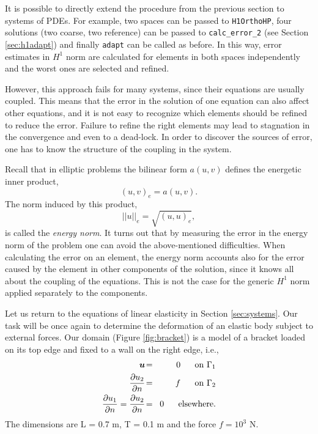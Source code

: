 It is possible to directly extend the procedure from the previous section to systems
of PDEs. For example, two spaces can be passed to {\tt H1OrthoHP}, four solutions (two coarse,
two reference) can be passed to \verb"calc_error_2" (see Section \ref{sec:h1adapt}) and finally
{\tt adapt} can be called as before. In this way, error estimates in $H^1$ norm are calculated
for elements in both spaces independently and the worst ones are selected and refined.

However, this approach fails for many systems, since their equations are usually coupled.
This means that the error in the solution of one equation can also affect other equations,
and it is not easy to recognize which elements should be refined to reduce the error.
Failure to refine the right elements may lead to stagnation in the convergence and even to a dead-lock.
In order to discover the sources of error, one has to know the structure of the coupling in the
system.

Recall that in elliptic problems the bilinear form $a(u,v)$ defines the energetic inner product,
$$(u,v)_e = a(u,v).$$
The norm induced by this product,
$$||u||_e = \sqrt{(u,u)_e},$$
is called the {\it energy norm}.  
It turns out that by measuring the error in the energy norm of the problem one can avoid the
above-mentioned difficulties. When calculating the error on an element, the energy norm accounts
also for the error caused by the element in other components of the solution, since it knows
all about the coupling of the equations. This is not the case for
the generic $H^1$ norm applied separately to the components.

Let us return to the equations of linear elasticity in Section \ref{sec:systems}. Our task
will be once again to determine the deformation of an elastic body subject to external forces.
Our domain (Figure \ref{fig:bracket}) is a model of a bracket loaded on its top edge and fixed
to a wall on the right edge, i.e.,
\begin{eqnarray*}
  \mbox{\boldmath $u$} \!&=&\! 0 \ \ \ \ \ \rm{on}\ \Gamma_1  \\
  \frac{\partial u_2}{\partial n} \!&=&\! f \ \ \ \ \ \rm{on}\ \Gamma_2 \\
  \frac{\partial u_1}{\partial n} = \frac{\partial u_2}{\partial n} \!&=&\! 0 \ \ \ \ \ \rm{elsewhere.}
\end{eqnarray*}
The dimensions are L = 0.7 m, T = 0.1 m and the force $f = 10^3$ N.

